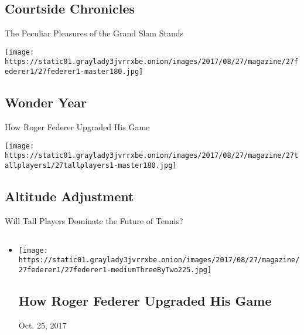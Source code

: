 \hypertarget{courtside-chronicles}{%
\subsection{Courtside Chronicles}\label{courtside-chronicles}}

The Peculiar Pleasures of the Grand Slam Stands

\href{https://www.nytimes3xbfgragh.onion/interactive/2017/08/24/magazine/usopen-federer-nadal-backhand-wonder-year.html}{}

\texttt{[image: https://static01.graylady3jvrrxbe.onion/images/2017/08/27/magazine/27federer1/27federer1-master180.jpg]}

\hypertarget{wonder-year}{%
\subsection{Wonder Year}\label{wonder-year}}

How Roger Federer Upgraded His Game

\href{https://www.nytimes3xbfgragh.onion/interactive/2017/08/24/magazine/usopen-tall-players-zverev-tennis-future.html}{}

\texttt{[image: https://static01.graylady3jvrrxbe.onion/images/2017/08/27/magazine/27tallplayers1/27tallplayers1-master180.jpg]}

\hypertarget{altitude-adjustment}{%
\subsection{Altitude Adjustment}\label{altitude-adjustment}}

Will Tall Players Dominate the Future of Tennis?

\hypertarget{-3}{%
\subsection{}\label{-3}}

\begin{itemize}
\item
  \href{https://www.nytimes3xbfgragh.onion/interactive/2017/08/24/magazine/usopen-federer-nadal-backhand-wonder-year.html}{}

  \texttt{[image: https://static01.graylady3jvrrxbe.onion/images/2017/08/27/magazine/27federer1/27federer1-mediumThreeByTwo225.jpg]}

  \hypertarget{how-roger-federer-upgraded-his-game}{%
  \subsection{How Roger Federer Upgraded His
  Game}\label{how-roger-federer-upgraded-his-game}}

  Oct. 25, 2017
\end{itemize}

